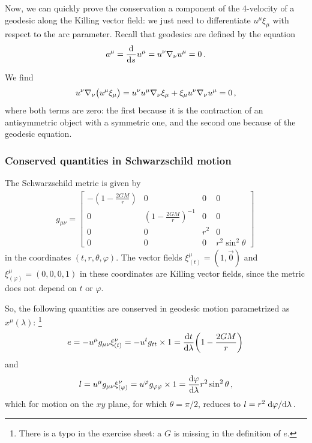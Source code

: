 \documentclass[main.tex]{subfiles}
\begin{document}
Now, we can quickly prove the conservation a component of the 4-velocity of a geodesic along the Killing vector field: we just need to differentiate \(u^{\mu } \xi_{\mu }\) with respect to the arc parameter. 
Recall that geodesics are defined by the equation 
%
\begin{align}
 a^{\mu } =  \dv[]{}{s} u^{\mu } = u^{\nu } \nabla_{\nu } u^{\mu } = 0 
\,.
\end{align}
%

We find 
%
\begin{align}
  u^{\nu }\nabla_{\nu }\qty(u^{\mu } \xi_{\mu })
  = u^{\nu } u^{\mu } \nabla_{\nu } \xi_{\mu } + \xi_{\mu } u^{\nu } \nabla_{\nu } u^{\mu } = 0
\,,
\end{align}
%
where both terms are zero: the first because it is the contraction of an antisymmetric object with a symmetric one, and the second one because of the geodesic equation. 

\subsubsection{Conserved quantities in Schwarzschild motion}

The Schwarzschild metric is given by 
%
\begin{subequations}
\begin{align}
  g_{\mu \nu } = \left[\begin{array}{cccc}
  -(1-\frac{2GM}{r}) & 0 & 0 & 0 \\ 
  0 & (1-\frac{2GM}{r})^{-1} & 0 & 0 \\ 
  0 & 0 & r^2 & 0 \\ 
  0 & 0 & 0 & r^2 \sin^2\theta 
  \end{array}\right]
\,
\end{align}
\end{subequations}
%
in the coordinates \((t, r, \theta , \varphi )\). The vector fields \(\xi_{(t)}^{\mu } = (1, \vec{0})\) and \(\xi_{(\varphi )}^{\mu } = (0,0,0,1)\) in these coordinates are Killing vector fields, since the metric does not depend on \(t\) or \(\varphi \). 

So, the following quantities are conserved in geodesic motion parametrized as \(x^{\mu }(\lambda )\): \footnote{There is a typo in the exercise sheet: a \(G\) is missing in the definition of \(e\).}
%
\begin{align}
  e = -u^{\mu } g_{\mu \nu } \xi^{\nu }_{(t)}
  = -u^{t} g_{tt } \times 1
  = \dv{t}{\lambda } \qty(1 - \frac{2GM}{r})
\,
\end{align}
%
and 
%
\begin{align}
  l = u^{\mu } g_{\mu \nu } \xi^{\nu }_{(\varphi )}
  = u^{\varphi } g_{\varphi \varphi } \times 1
  = \dv{\varphi }{\lambda } r^2 \sin^2\theta 
\,,
\end{align}
%
which for motion on the \(xy\) plane, for which \(\theta = \pi /2\), reduces to \(l = r^2 \dv*{\varphi }{\lambda }\).
\end{document}

